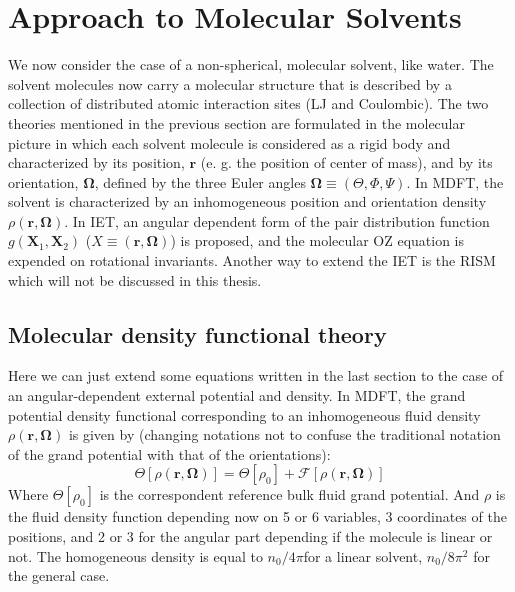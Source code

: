 
\chapter{Approach to Molecular Solvents\label{chpt:iem-mdft}}

We now consider the case of a non-spherical, molecular solvent, like
water. The solvent molecules now carry a molecular structure that
is described by a collection of distributed atomic interaction sites
(LJ and Coulombic). The two theories mentioned in the previous section
are formulated in the molecular picture in which each solvent molecule
is considered as a rigid body and characterized by its position, $\mathbf{r}$
(e. g. the position of center of mass), and by its orientation, $\mathbf{\Omega}$,
defined by the three Euler angles $\mathbf{\Omega}\equiv(\Theta,\Phi,\Psi)$.
In \acs{MDFT}, the solvent is characterized by an inhomogeneous position
and orientation density $\rho(\mathbf{r},\mathbf{\Omega})$. In \acs{IET},
an angular dependent form of the pair distribution function $g(\mathbf{X}_{1},\mathbf{X}_{2})$
($X\equiv(\mathbf{r},\mathbf{\Omega})$) is proposed, and the molecular
\acs{OZ} equation is expended on rotational invariants. Another way
to extend the IET is the RISM \citep{hirata_molecular_2004} which
will not be discussed in this thesis.

\section{Molecular density functional theory}

Here we can just extend some equations written in the last section
to the case of an angular-dependent external potential and density.
In \acf{MDFT}, the grand potential density functional corresponding
to an inhomogeneous fluid density $\rho(\mathbf{r},\mathbf{\Omega})$
is given by (changing notations not to confuse the traditional notation
of the grand potential with that of the orientations):
\begin{equation}
\Theta[\rho(\mathbf{r},\mathbf{\Omega})]=\Theta[\rho_{0}]+\mathcal{F}[\rho(\mathbf{r},\mathbf{\Omega})]
\end{equation}
Where $\Theta[\rho_{0}]$ is the correspondent reference bulk fluid
grand potential. And $\rho$ is the fluid density function depending
now on 5 or 6 variables, 3 coordinates of the positions, and 2 or
3 for the angular part depending if the molecule is linear or not.
The homogeneous density is equal to $n_{0}/4\pi$for a linear solvent,
$n_{0}/8\pi^{2}$ for the general case.

